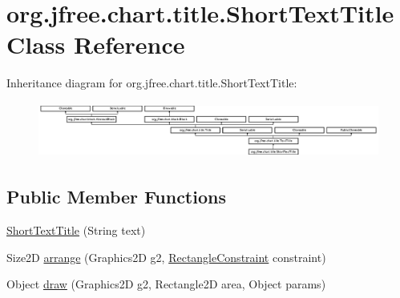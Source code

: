 \hypertarget{classorg_1_1jfree_1_1chart_1_1title_1_1_short_text_title}{}\section{org.\+jfree.\+chart.\+title.\+Short\+Text\+Title Class Reference}
\label{classorg_1_1jfree_1_1chart_1_1title_1_1_short_text_title}
Inheritance diagram for org.\+jfree.\+chart.\+title.\+Short\+Text\+Title\+:\begin{figure}[H]
\begin{center}
\leavevmode
\includegraphics[height=1.834862cm]{classorg_1_1jfree_1_1chart_1_1title_1_1_short_text_title}
\end{center}
\end{figure}
\subsection*{Public Member Functions}
\begin{DoxyCompactItemize}
\item 
\mbox{\hyperlink{classorg_1_1jfree_1_1chart_1_1title_1_1_short_text_title_af7c63f8c49b6ef980b2ed7414e74d6a6}{Short\+Text\+Title}} (String text)
\item 
Size2D \mbox{\hyperlink{classorg_1_1jfree_1_1chart_1_1title_1_1_short_text_title_aed42f3ff529f06abb2bc28f0ed8e15a9}{arrange}} (Graphics2D g2, \mbox{\hyperlink{classorg_1_1jfree_1_1chart_1_1block_1_1_rectangle_constraint}{Rectangle\+Constraint}} constraint)
\item 
Object \mbox{\hyperlink{classorg_1_1jfree_1_1chart_1_1title_1_1_short_text_title_a9c5effc8dfa4bf48e1aaf3fa62c3c416}{draw}} (Graphics2D g2, Rectangle2D area, Object params)
\end{DoxyCompactItemize}
